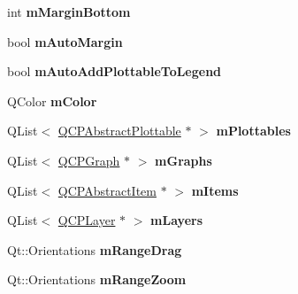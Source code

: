 \begin{DoxyCompactItemize}
\item 
\hypertarget{classQCustomPlot_a2b11299cca5bd848821cafac1d8544a9}{int {\bfseries m\-Margin\-Bottom}}\label{classQCustomPlot_a2b11299cca5bd848821cafac1d8544a9}

\item 
\hypertarget{classQCustomPlot_a062250ee271589efcc4e501e676c1d74}{bool {\bfseries m\-Auto\-Margin}}\label{classQCustomPlot_a062250ee271589efcc4e501e676c1d74}

\item 
\hypertarget{classQCustomPlot_aaf3ea6a4cb04d35a149cc9a0cdac3394}{bool {\bfseries m\-Auto\-Add\-Plottable\-To\-Legend}}\label{classQCustomPlot_aaf3ea6a4cb04d35a149cc9a0cdac3394}

\item 
\hypertarget{classQCustomPlot_a653335b5475ede92ae8c9215606a573a}{Q\-Color {\bfseries m\-Color}}\label{classQCustomPlot_a653335b5475ede92ae8c9215606a573a}

\item 
\hypertarget{classQCustomPlot_a62bf8e4e7f8d23fc1e9301ba0148269f}{Q\-List$<$ \hyperlink{classQCPAbstractPlottable}{Q\-C\-P\-Abstract\-Plottable} $\ast$ $>$ {\bfseries m\-Plottables}}\label{classQCustomPlot_a62bf8e4e7f8d23fc1e9301ba0148269f}

\item 
\hypertarget{classQCustomPlot_adaf8d407d72a725169d7dbed2ee386bb}{Q\-List$<$ \hyperlink{classQCPGraph}{Q\-C\-P\-Graph} $\ast$ $>$ {\bfseries m\-Graphs}}\label{classQCustomPlot_adaf8d407d72a725169d7dbed2ee386bb}

\item 
\hypertarget{classQCustomPlot_a6a93905372326e31e98d6c3bc8953ec8}{Q\-List$<$ \hyperlink{classQCPAbstractItem}{Q\-C\-P\-Abstract\-Item} $\ast$ $>$ {\bfseries m\-Items}}\label{classQCustomPlot_a6a93905372326e31e98d6c3bc8953ec8}

\item 
\hypertarget{classQCustomPlot_a72ee313041b873d76c198793ce7e6c37}{Q\-List$<$ \hyperlink{classQCPLayer}{Q\-C\-P\-Layer} $\ast$ $>$ {\bfseries m\-Layers}}\label{classQCustomPlot_a72ee313041b873d76c198793ce7e6c37}

\item 
\hypertarget{classQCustomPlot_af22d256e06e90adf0952ea3315ba808c}{Qt\-::\-Orientations {\bfseries m\-Range\-Drag}}\label{classQCustomPlot_af22d256e06e90adf0952ea3315ba808c}

\item 
\hypertarget{classQCustomPlot_aaa5301107982716d6e72dbd24c7be172}{Qt\-::\-Orientations {\bfseries m\-Range\-Zoom}}\label{classQCustomPlot_aaa5301107982716d6e72dbd24c7be172}


\end{DoxyCompactItemize}
